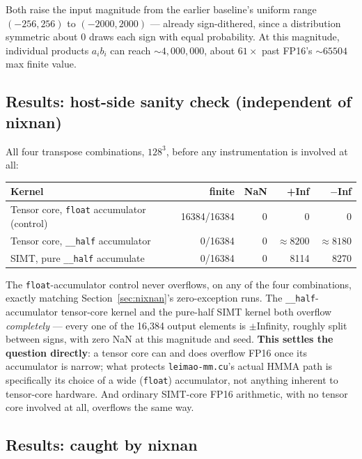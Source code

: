 \documentclass[11pt]{article}
\begin{document}
Both raise the input magnitude from the earlier baseline's uniform range
$(-256, 256)$ to $(-2000, 2000)$ --- already
sign-dithered, since a distribution symmetric about 0 draws each sign with
equal probability. At this magnitude, individual products $a_i b_i$ can
reach $\sim\!4{,}000{,}000$, about $61\times$ past FP16's $\sim\!65504$ max
finite value.

\subsection{Results: host-side sanity check (independent of nixnan)}

All four transpose combinations, $128^3$, before any instrumentation is
involved at all:

\begin{center}
\small
\begin{tabular}{lrrrr}
\toprule
Kernel & finite & NaN & +Inf & $-$Inf \\
\midrule
Tensor core, \texttt{float} accumulator (control) & 16384/16384 & 0 & 0 & 0 \\
Tensor core, \texttt{\_\_half} accumulator & 0/16384 & 0 & $\approx\!8200$ & $\approx\!8180$ \\
SIMT, pure \texttt{\_\_half} accumulate & 0/16384 & 0 & 8114 & 8270 \\
\bottomrule
\end{tabular}
\end{center}

The \texttt{float}-accumulator control never overflows, on any of the four
combinations, exactly matching Section~\ref{sec:nixnan}'s zero-exception
runs. The \texttt{\_\_half}-accumulator tensor-core kernel and the pure-half
SIMT kernel both overflow \emph{completely} --- every one of the 16{,}384
output elements is $\pm$Infinity, roughly split between signs, with zero
NaN at this magnitude and seed. \textbf{This settles the question
directly}: a tensor core can and does overflow FP16 once its accumulator is
narrow; what protects \texttt{leimao-mm.cu}'s actual HMMA path is
specifically its choice of a wide (\texttt{float}) accumulator, not
anything inherent to tensor-core hardware. And ordinary SIMT-core FP16
arithmetic, with no tensor core involved at all, overflows the same way.

\subsection{Results: caught by nixnan}
\end{document}
